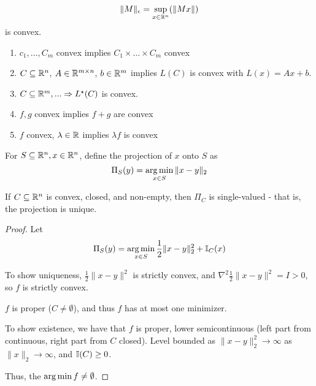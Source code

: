 \begin{remark}
  \begin{align*}
    \| M \|_{\epsilon} = \sup_{x \in \mathbb{R}^{n}} (\| M x\|)
  \end{align*} is convex.
\end{remark}

\begin{proposition}
  \begin{enumerate}
  \item $c_{1}, \dots, C_{m}$ convex implies $C_{1} \times \dots \times
    C_{m}$ convex
  \item $C \subseteq \mathbb{R}^{n}$, $A \in \mathbb{R}^{m \times n}$, $b \in \mathbb{R}^{m}$
    implies $L(C)$ is convex with $L(x) = Ax + b$.
  \item $C \subseteq \mathbb{R}^{m}, ... \Rightarrow L^{\star}(C)$ is convex.
  \item $f, g$ convex implies $f + g$ are convex
  \item $f$ convex, $\lambda \in \mathbb{R}$ implies $\lambda f$ is convex
  \end{enumerate}
\end{proposition}


\begin{defn}
  \label{defn:convexity:7}
  For $S \subseteq \mathbb{R}^{n}, x \in \mathbb{R}^{n}$, define the projection of $x$
  onto $S$ as
  \begin{equation}
    \Pi_{S}(y) = \operatorname*{arg\,min}_{x \in S} \| x - y \|_{2}
  \end{equation}
\end{defn}

\begin{proposition}
  If $C \subseteq \mathbb{R}^{n}$ is convex, closed, and non-empty, then
  $\Pi_{C}$ is single-valued - that is, the projection is unique.
\end{proposition}

\begin{proof}
  Let
  \begin{equation}
    \Pi_{S}(y) = \argmin_{x \in S} \frac{1}{2} \| x - y \|_{2}^{2} + \I_{C}(x)
  \end{equation}

  To show uniqueness, $\frac{1}{2} \| x - y \|^{2}$ is strictly
  convex, and $\nabla^{2} \frac{1}{2} \| x - y \|^{2} = I > 0$, so $f$
  is strictly convex.

  $f$ is proper ($C \neq \emptyset$), and thus $f$ has at most one
  minimizer.

  To show existence, we have that $f$ is proper, lower semicontinuous
  (left part from continuous, right part from $C$ closed). Level
  bounded as $\| x - y \|_{2}^{2} \rightarrow \infty$ as $\| x \|_{2}
  \rightarrow \infty$, and $\I{C} \geq 0$.

  Thus, the $\operatorname*{arg\,min} f \neq \emptyset$.
\end{proof}

